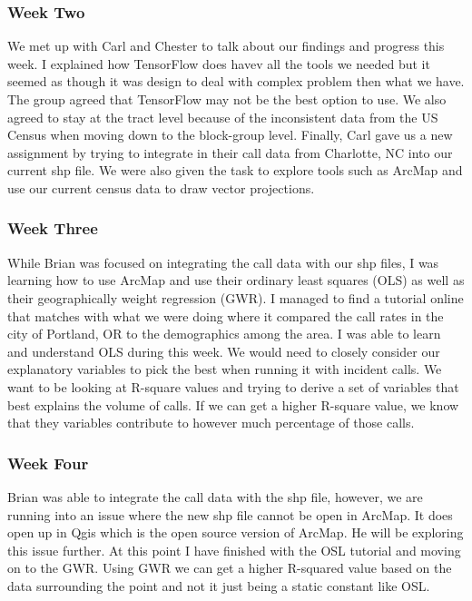 \documentclass[onecolumn, draftclsnofoot,10pt, compsoc]{IEEEtran}
\begin{document}
\begin{singlespace}
\subsubsection{Week Two} \label{k_w2}
We met up with Carl and Chester to talk about our findings and progress this week.
I explained how TensorFlow does havev all the tools we needed but it seemed as though it was design to deal with complex problem then what we have.
The group agreed that TensorFlow may not be the best option to use.
We also agreed to stay at the tract level because of the inconsistent data from the US Census when moving down to the block-group level.
Finally, Carl gave us a new assignment by trying to integrate in their call data from Charlotte, NC into our current shp file.
We were also given the task to explore tools such as ArcMap and use our current census data to draw vector projections.

\subsubsection{Week Three} \label{k_w3}
While Brian was focused on integrating the call data with our shp files, I was learning how to use ArcMap and use their ordinary least squares (OLS) as well as their geographically weight regression (GWR).
I managed to find a tutorial online that matches with what we were doing where it compared the call rates in the city of Portland, OR to the demographics among the area.
I was able to learn and understand OLS during this week.
We would need to closely consider our explanatory variables to pick the best when running it with incident calls.
We want to be looking at R-square values and trying to derive a set of variables that best explains the volume of calls.
If we can get a higher R-square value, we know that they variables contribute to however much percentage of those calls.

\subsubsection{Week Four} \label{k_w4}
Brian was able to integrate the call data with the shp file, however, we are running into an issue where the new shp file cannot be open in ArcMap.
It does open up in Qgis which is the open source version of ArcMap.
He will be exploring this issue further.
At this point I have finished with the OSL tutorial and moving on to the GWR.
Using GWR we can get a higher R-squared value based on the data surrounding the point and not it just being a static constant like OSL.


\end{singlespace}
\end{document}
